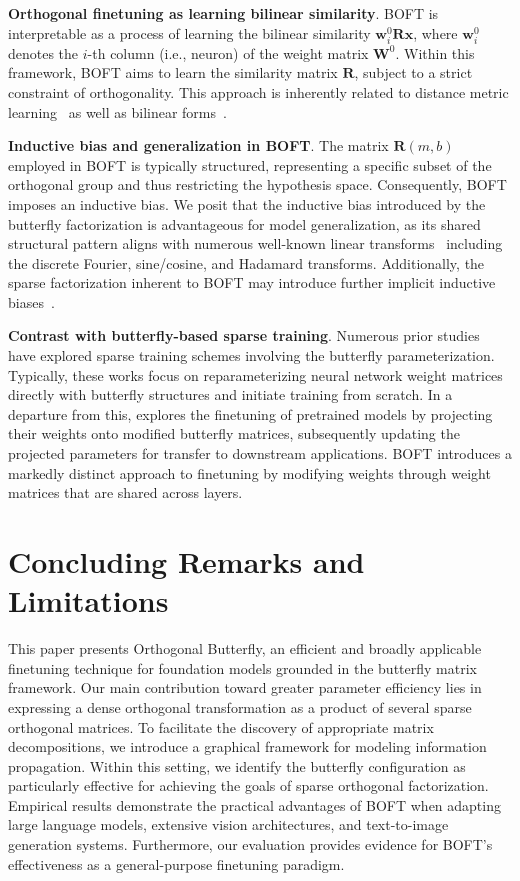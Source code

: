 \textbf{Orthogonal finetuning as learning bilinear similarity}. BOFT is interpretable as a process of learning the bilinear similarity $\bm{w}^0_i\bm{R}\bm{x}$, where $\bm{w}^0_i$ denotes the $i$-th column (i.e., neuron) of the weight matrix $\bm{W}^0$. Within this framework, BOFT aims to learn the similarity matrix $\bm{R}$, subject to a strict constraint of orthogonality. This approach is inherently related to distance metric learning~\cite{xing2002distance} as well as bilinear forms~\cite{roman2005advanced}.

\textbf{Inductive bias and generalization in BOFT}. The matrix $\bm{R}(m,b)$ employed in BOFT is typically structured, representing a specific subset of the orthogonal group and thus restricting the hypothesis space. Consequently, BOFT imposes an inductive bias. We posit that the inductive bias introduced by the butterfly factorization is advantageous for model generalization, as its shared structural pattern aligns with numerous well-known linear transforms~\cite{dao2019kaleidoscope} including the discrete Fourier, sine/cosine, and Hadamard transforms. Additionally, the sparse factorization inherent to BOFT may introduce further implicit inductive biases~\cite{gunasekar2017implicit,li2018algorithmic,liu2019neural}.

\textbf{Contrast with butterfly-based sparse training}. Numerous prior studies~\cite{dao2019learning,dao2019kaleidoscope,chen2022pixelated,dao2022monarch} have explored sparse training schemes involving the butterfly parameterization. Typically, these works focus on reparameterizing neural network weight matrices directly with butterfly structures and initiate training from scratch. In a departure from this, \cite{dao2022monarch} explores the finetuning of pretrained models by projecting their weights onto modified butterfly matrices, subsequently updating the projected parameters for transfer to downstream applications. BOFT introduces a markedly distinct approach to finetuning by modifying weights through weight matrices that are shared across layers.



\section{Concluding Remarks and Limitations}

This paper presents Orthogonal Butterfly, an efficient and broadly applicable finetuning technique for foundation models grounded in the butterfly matrix framework. Our main contribution toward greater parameter efficiency lies in expressing a dense orthogonal transformation as a product of several sparse orthogonal matrices. To facilitate the discovery of appropriate matrix decompositions, we introduce a graphical framework for modeling information propagation. Within this setting, we identify the butterfly configuration as particularly effective for achieving the goals of sparse orthogonal factorization. Empirical results demonstrate the practical advantages of BOFT when adapting large language models, extensive vision architectures, and text-to-image generation systems. Furthermore, our evaluation provides evidence for BOFT’s effectiveness as a general-purpose finetuning paradigm.

